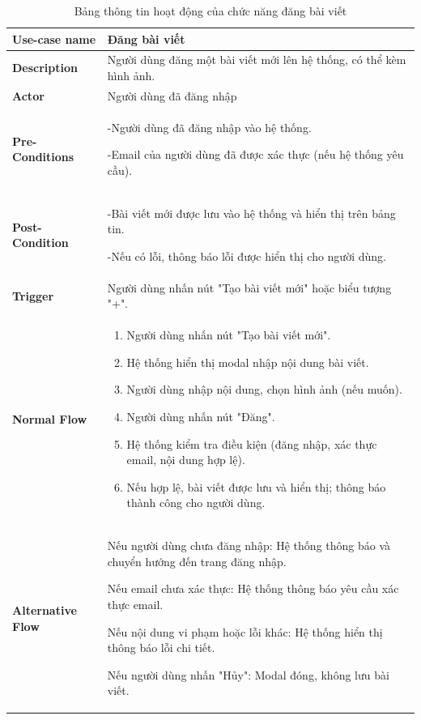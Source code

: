 \begin{longtable}{|>{\bfseries}m{4cm}|m{10cm}|}
\caption{Bảng thông tin hoạt động của chức năng đăng bài viết}
\label{table:usecase-posts}\\
\hline
Use-case name & Đăng bài viết \\ 
\hline 
Description & Người dùng đăng một bài viết mới lên hệ thống, có thể kèm hình ảnh.\\
\hline
Actor & Người dùng đã đăng nhập\\
\hline
Pre-Conditions & -Người dùng đã đăng nhập vào hệ thống.

-Email của người dùng đã được xác thực (nếu hệ thống yêu cầu).\\
\hline
Post-Condition & -Bài viết mới được lưu vào hệ thống và hiển thị trên bảng tin.

-Nếu có lỗi, thông báo lỗi được hiển thị cho người dùng.\\
\hline
Trigger & Người dùng nhấn nút "Tạo bài viết mới" hoặc biểu tượng "+".\\
\hline
Normal Flow &
\begin{enumerate}
    \item Người dùng nhấn nút "Tạo bài viết mới".
    \item Hệ thống hiển thị modal nhập nội dung bài viết.
    \item Người dùng nhập nội dung, chọn hình ảnh (nếu muốn).
    \item Người dùng nhấn nút "Đăng".
    \item Hệ thống kiểm tra điều kiện (đăng nhập, xác thực email, nội dung hợp lệ).
    \item Nếu hợp lệ, bài viết được lưu và hiển thị; thông báo thành công cho người dùng.
\end{enumerate} \\
\hline
Alternative Flow & Nếu người dùng chưa đăng nhập: Hệ thống thông báo và chuyển hướng đến trang đăng nhập.

Nếu email chưa xác thực: Hệ thống thông báo yêu cầu xác thực email.

Nếu nội dung vi phạm hoặc lỗi khác: Hệ thống hiển thị thông báo lỗi chi tiết.

Nếu người dùng nhấn "Hủy": Modal đóng, không lưu bài viết.\\
\hline
\end{longtable}


